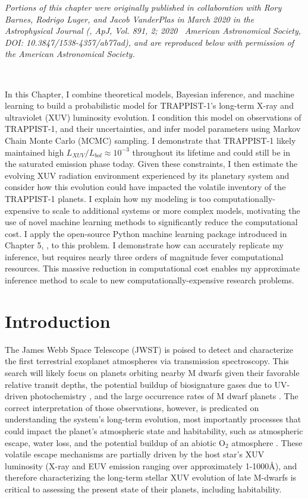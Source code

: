 \textit{Portions of this chapter were originally published in collaboration with Rory Barnes, Rodrigo Luger, and Jacob VanderPlas in March 2020 in the Astrophysical Journal (\citet{Fleming2020}, ApJ, Vol. 891, 2; 2020 \textcopyright \ American Astronomical Society, DOI: 10.3847/1538-4357/ab77ad), and are reproduced below with permission of the American Astronomical Society.}

\

In this Chapter, I combine theoretical models, Bayesian inference, and machine learning to build a probabilistic model for TRAPPIST-1's long-term X-ray and ultraviolet (XUV) luminosity evolution. I condition this model on observations of TRAPPIST-1, and their uncertainties, and infer model parameters using Markov Chain Monte Carlo (MCMC) sampling. I demonstrate that TRAPPIST-1 likely maintained high $L_{XUV}/L_{bol} \approx 10^{-3}$ throughout its lifetime and could still be in the saturated emission phase today. Given these constraints, I then estimate the evolving XUV radiation environment experienced by its planetary system and consider how this evolution could have impacted the volatile inventory of the TRAPPIST-1 planets. I explain how my modeling is too computationally-expensive to scale to additional systems or more complex models, motivating the use of novel machine learning methods to significantly reduce the computational cost. I apply the open-source Python machine learning package introduced in Chapter 5, \approxposterior, to this problem. I demonstrate how \approxposterior can accurately replicate my inference, but requires nearly three orders of magnitude fever computational resources. This massive reduction in computational cost enables my approximate inference method to scale to new computationally-expensive research problems. 


\section{Introduction} \label{trap:sec:intro}

The James Webb Space Telescope (JWST) is poised to detect and characterize the first terrestrial exoplanet atmospheres via transmission spectroscopy. This search will likely focus on planets orbiting nearby M dwarfs given their favorable relative transit depths, the potential buildup of biosignature gases due to UV-driven photochemistry \citep{Segura2005}, and the large occurrence rates of M dwarf planets \citep{Dressing2015}. The correct interpretation of those observations, however, is predicated on understanding the system's long-term evolution, most importantly processes that could impact the planet's atmospheric state and habitability, such as atmospheric escape, water loss, and the potential buildup of an abiotic O$_2$ atmosphere \citep{Watson1981,Lammer2003,MurrayClay2009,Luger2015}. These volatile escape mechanisms are partially driven by the host star's XUV luminosity (X-ray and EUV emission ranging over approximately 1-1000\AA), and therefore characterizing the long-term stellar XUV evolution of late M-dwarfs is critical to assessing the present state of their planets, including habitability.

